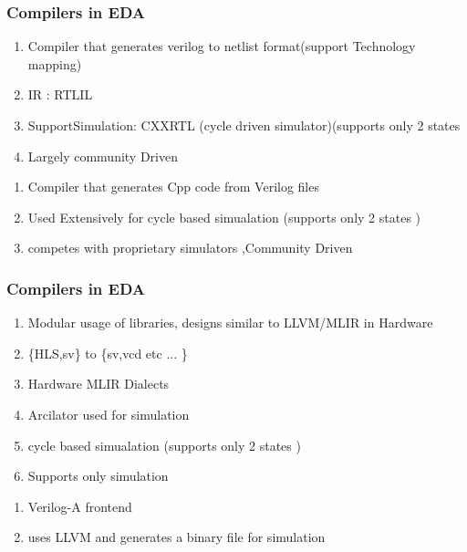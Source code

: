 \documentclass{beamer}
\begin{document}
\begin{frame}[fragile]
    \frametitle{Compilers in EDA}
        \begin{enumerate}
            \item Compiler that generates  verilog to netlist format(support Technology mapping)
            \item IR : RTLIL
            \item SupportSimulation: CXXRTL (cycle driven simulator)(supports only 2 states
            \item Largely community Driven
        \end{enumerate}
        \begin{enumerate}
            \item Compiler that generates Cpp code from Verilog files
            \item Used Extensively for cycle based simualation (supports only 2 states )
            \item competes with proprietary simulators ,Community Driven
        \end{enumerate}
    
\end{frame}

\begin{frame}[fragile]
    \frametitle{Compilers in EDA}
        \begin{enumerate}
            \item Modular usage of libraries, designs similar to LLVM/MLIR in Hardware  
            \item \{HLS,sv\} to \{sv,vcd etc ... \}
            \item Hardware MLIR  Dialects 
            \item Arcilator used for simulation 
                \item cycle based simualation (supports only 2 states )
            \item Supports only simulation 
        \end{enumerate}
        \begin{enumerate}
            \item Verilog-A frontend 
            \item uses LLVM and generates a binary file for simulation
        \end{enumerate}
\end{frame}
\end{document}
